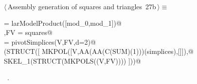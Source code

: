 \documentclass[11pt,oneside]{article}	%
\begin{document}
\begin{flushleft} \small
\begin{minipage}{\linewidth} \label{scrap67}
\protect{}$\langle\,$Assembly generation of squares and triangles\nobreak\ {\footnotesize 27b}$\,\rangle\equiv$
\vspace{-1ex}
\begin{list}{}{} \item
\mbox{}\verb@squares = larModelProduct([mod_0,mod_1])@\\
\mbox{}\verb@V,FV = squares@\\
\mbox{}\verb@simplices = pivotSimplices(V,FV,d=2)@\\
\mbox{}\verb@VIEW(STRUCT([ MKPOL([V,AA(AA(C(SUM)(1)))(simplices),[]]),@\\
\mbox{}\verb@              SKEL_1(STRUCT(MKPOLS((V,FV)))) ]))@\\
\mbox{}\verb@@{\NWsep}
\end{list}
\vspace{-1ex}
\footnotesize\addtolength{\baselineskip}{-1ex}
\begin{list}{}{\setlength{\itemsep}{-\parsep}\setlength{\itemindent}{-\leftmargin}}
\item \NWtxtMacroRefIn\ .
\end{list}
\end{minipage}\\[4ex]
\end{flushleft}
\end{document}
